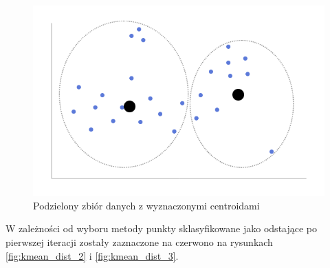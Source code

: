 \documentclass[eng,printmode]{mgr}
\begin{document}
\begin{figure}[H]
  \begin{center}
    \includegraphics[scale=0.5]{kmean_dist_1}
        \caption{Podzielony zbiór danych z wyznaczonymi centroidami}
        \label{fig:kmean_dist_1}
  \end{center}
\end{figure}
W zależności od wyboru metody punkty sklasyfikowane jako odstające po pierwszej iteracji zostały zaznaczone na czerwono na rysunkach \ref{fig:kmean_dist_2} i \ref{fig:kmean_dist_3}.\\
\end{document}
